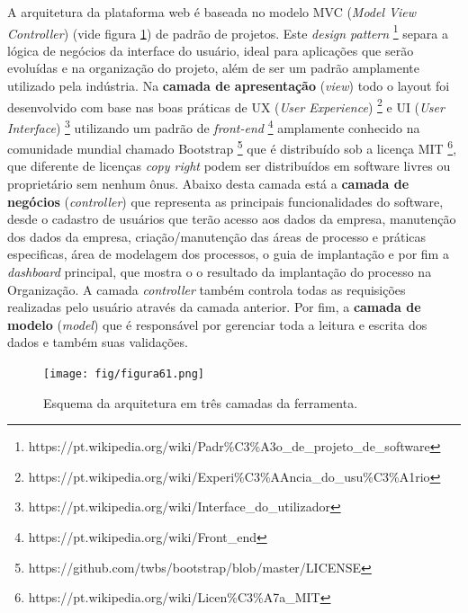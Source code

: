 A arquitetura da plataforma web é baseada no modelo MVC (\textit{Model View Controller}) \cite{Reenskaug1979} (vide figura \ref{fig:fig61}) de padrão de projetos. Este \textit{design pattern} \footnote{https://pt.wikipedia.org/wiki/Padr\%C3\%A3o_de_projeto_de_software} separa a lógica de negócios da interface do usuário, ideal para aplicações que serão evoluídas e na organização do projeto, além de ser um padrão amplamente utilizado pela indústria. Na \textbf{camada de apresentação} (\textit{view}) todo o layout foi desenvolvido com base nas boas práticas de UX (\textit{User Experience}) \footnote{https://pt.wikipedia.org/wiki/Experi\%C3\%AAncia_do_usu\%C3\%A1rio} e UI (\textit{User Interface}) \footnote{https://pt.wikipedia.org/wiki/Interface_do_utilizador} utilizando um padrão de \textit{front-end} \footnote{https://pt.wikipedia.org/wiki/Front_end} amplamente conhecido na comunidade mundial chamado Bootstrap \footnote{https://github.com/twbs/bootstrap/blob/master/LICENSE} que é distribuído sob a licença MIT \footnote{https://pt.wikipedia.org/wiki/Licen\%C3\%A7a_MIT}, que diferente de licenças \textit{copy right} podem ser distribuídos em software livres ou proprietário sem nenhum ônus. Abaixo desta camada está a \textbf{camada de negócios} (\textit{controller}) que representa as principais funcionalidades do software, desde o cadastro de usuários que terão acesso aos dados da empresa, manutenção dos dados da empresa, criação/manutenção das áreas de processo e práticas especificas, área de modelagem dos processos, o guia de implantação e por fim a \textit{dashboard} principal, que mostra o o resultado da implantação do processo na Organização. A camada \textit{controller} também controla todas as requisições realizadas pelo usuário através da camada anterior. Por fim, a \textbf{camada de modelo} (\textit{model}) que é responsável por gerenciar toda a leitura e escrita dos dados e também suas validações.

\begin{figure}[H]
\centering
\texttt{[image: fig/figura61.png]}
\caption{Esquema da arquitetura em três camadas da ferramenta.}
\label{fig:fig61}
\end{figure}


